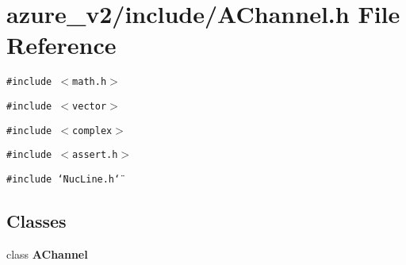 \section{azure\_\-v2/include/AChannel.h File Reference}
\label{AChannel_8h}
{\tt \#include $<$math.h$>$}\par
{\tt \#include $<$vector$>$}\par
{\tt \#include $<$complex$>$}\par
{\tt \#include $<$assert.h$>$}\par
{\tt \#include \char`\"{}Nuc\-Line.h\char`\"{}}\par
\subsection*{Classes}
\begin{CompactItemize}
\item 
class \bf{AChannel}
\end{CompactItemize}
